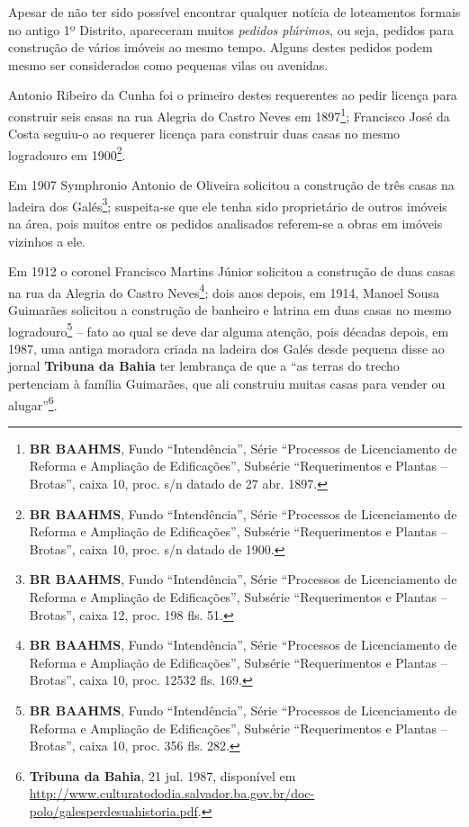 
Apesar de não ter sido possível encontrar qualquer notícia de loteamentos formais no antigo 1º Distrito, apareceram muitos \textit{pedidos plúrimos}, ou seja, pedidos para construção de vários imóveis ao mesmo tempo. Alguns destes pedidos podem mesmo ser considerados como pequenas vilas ou avenidas.


Antonio Ribeiro da Cunha foi o primeiro destes requerentes ao pedir licença para construir seis casas na rua Alegria do Castro Neves em 1897\footnote{\textbf{BR BAAHMS}, Fundo ``Intendência'', Série ``Processos de Licenciamento de Reforma e Ampliação de Edificações'', Subsérie ``Requerimentos e Plantas -- Brotas'', caixa 10, proc. s/n datado de 27 abr. 1897.}; Francisco José da Costa seguiu-o ao requerer licença para construir duas casas no mesmo logradouro em 1900\footnote{\textbf{BR BAAHMS}, Fundo ``Intendência'', Série ``Processos de Licenciamento de Reforma e Ampliação de Edificações'', Subsérie ``Requerimentos e Plantas -- Brotas'', caixa 10, proc. s/n datado de 1900.}.

Em 1907 Symphronio Antonio de Oliveira solicitou a construção de três casas na ladeira dos Galés\footnote{\textbf{BR BAAHMS}, Fundo ``Intendência'', Série ``Processos de Licenciamento de Reforma e Ampliação de Edificações'', Subsérie ``Requerimentos e Plantas -- Brotas'', caixa 12, proc. 198 fls. 51.}; suspeita-se que ele tenha sido proprietário de outros imóveis na área, pois muitos entre os pedidos analisados referem-se a obras em imóveis vizinhos a ele.

Em 1912 o coronel Francisco Martins Júnior solicitou a construção de duas casas na rua da Alegria do Castro Neves\footnote{\textbf{BR BAAHMS}, Fundo ``Intendência'', Série ``Processos de Licenciamento de Reforma e Ampliação de Edificações'', Subsérie ``Requerimentos e Plantas -- Brotas'', caixa 10, proc. 12532 fls. 169.}; dois anos depois, em 1914, Manoel Sousa Guimarães solicitou a construção de banheiro e latrina em duas casas no mesmo logradouro\footnote{\textbf{BR BAAHMS}, Fundo ``Intendência'', Série ``Processos de Licenciamento de Reforma e Ampliação de Edificações'', Subsérie ``Requerimentos e Plantas -- Brotas'', caixa 10, proc. 356 fls. 282.} -- fato ao qual se deve dar alguma atenção, pois décadas depois, em 1987, uma antiga moradora criada na ladeira dos Galés desde pequena disse ao jornal \textbf{Tribuna da Bahia} ter lembrança de que a ``as terras do trecho pertenciam à família Guimarães, que ali construiu muitas casas para vender ou alugar''\footnote{\textbf{Tribuna da Bahia}, 21 jul. 1987, disponível em \url{http://www.culturatododia.salvador.ba.gov.br/doc-polo/galesperdesuahistoria.pdf}.}.

